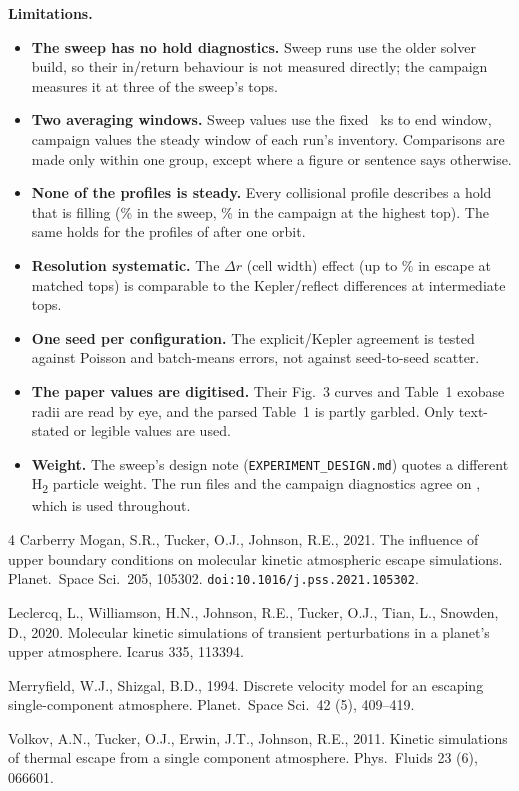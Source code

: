 \documentclass[10pt]{article}
\newcommand{\para}[1]{\textbf{#1}\hspace{0.5em}}
\newcommand{\Htwo}{H\textsubscript{2}}
\begin{document}
\para{Limitations.}
\begin{itemize}
  \item \textbf{The sweep has no hold diagnostics.} Sweep runs use the older solver build, so their in/return behaviour is not measured directly; the campaign measures it at three of the sweep's tops.
  \item \textbf{Two averaging windows.} Sweep values use the fixed \profWindowReflect{}~ks to end window, campaign values the steady window of each run's inventory. Comparisons are made only within one group, except where a figure or sentence says otherwise.
  \item \textbf{None of the profiles is steady.} Every collisional profile describes a hold that is filling (\heldFracSweepEnd{}\% in the sweep, \heldFracCampEnd{}\% in the campaign at the highest top). The same holds for the profiles of \citet{cm21} after one orbit.
  \item \textbf{Resolution systematic.} The $\Delta r$ (cell width) effect (up to \drEffectMax{}\% in escape at matched tops) is comparable to the Kepler/reflect differences at intermediate tops.
  \item \textbf{One seed per configuration.} The explicit/Kepler agreement is tested against Poisson and batch-means errors, not against seed-to-seed scatter.
  \item \textbf{The paper values are digitised.} Their Fig.~3 curves and Table~1 exobase radii are read by eye, and the parsed Table~1 is partly garbled. Only text-stated or legible values are used.
  \item \textbf{Weight.} The sweep's design note (\texttt{EXPERIMENT\_DESIGN.md}) quotes a different \Htwo{} particle weight. The run files and the campaign diagnostics agree on \oWeight{}, which is used throughout.
\end{itemize}

\begin{thebibliography}{4}
\small
{}
Carberry Mogan, S.R., Tucker, O.J., Johnson, R.E., 2021. The influence of upper boundary conditions on molecular kinetic atmospheric escape simulations. Planet.\ Space Sci.\ 205, 105302. \texttt{doi:10.1016/j.pss.2021.105302}.

Leclercq, L., Williamson, H.N., Johnson, R.E., Tucker, O.J., Tian, L., Snowden, D., 2020. Molecular kinetic simulations of transient perturbations in a planet's upper atmosphere. Icarus 335, 113394.

Merryfield, W.J., Shizgal, B.D., 1994. Discrete velocity model for an escaping single-component atmosphere. Planet.\ Space Sci.\ 42 (5), 409–419.

Volkov, A.N., Tucker, O.J., Erwin, J.T., Johnson, R.E., 2011. Kinetic simulations of thermal escape from a single component atmosphere. Phys.\ Fluids 23 (6), 066601.
\end{thebibliography}
\end{document}
